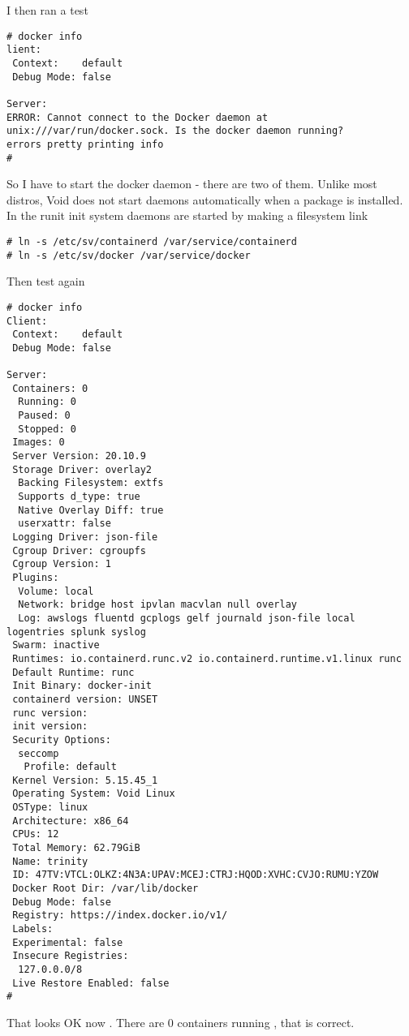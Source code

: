 \documentclass{article}  %
\begin{document}
I then ran a test
\begin{verbatim}
# docker info
lient:
 Context:    default
 Debug Mode: false

Server:
ERROR: Cannot connect to the Docker daemon at unix:///var/run/docker.sock. Is the docker daemon running?
errors pretty printing info
# 
\end{verbatim}

 So I have to start the docker daemon - there are two of them. Unlike most distros, Void does not start daemons automatically when a package is installed. In the runit init system daemons are started by making a filesystem link
\begin{verbatim}
# ln -s /etc/sv/containerd /var/service/containerd
# ln -s /etc/sv/docker /var/service/docker
\end{verbatim}

Then test again
\begin{verbatim}
# docker info
Client:
 Context:    default
 Debug Mode: false

Server:
 Containers: 0
  Running: 0
  Paused: 0
  Stopped: 0
 Images: 0
 Server Version: 20.10.9
 Storage Driver: overlay2
  Backing Filesystem: extfs
  Supports d_type: true
  Native Overlay Diff: true
  userxattr: false
 Logging Driver: json-file
 Cgroup Driver: cgroupfs
 Cgroup Version: 1
 Plugins:
  Volume: local
  Network: bridge host ipvlan macvlan null overlay
  Log: awslogs fluentd gcplogs gelf journald json-file local logentries splunk syslog
 Swarm: inactive
 Runtimes: io.containerd.runc.v2 io.containerd.runtime.v1.linux runc
 Default Runtime: runc
 Init Binary: docker-init
 containerd version: UNSET
 runc version: 
 init version: 
 Security Options:
  seccomp
   Profile: default
 Kernel Version: 5.15.45_1
 Operating System: Void Linux
 OSType: linux
 Architecture: x86_64
 CPUs: 12
 Total Memory: 62.79GiB
 Name: trinity
 ID: 47TV:VTCL:OLKZ:4N3A:UPAV:MCEJ:CTRJ:HQOD:XVHC:CVJO:RUMU:YZOW
 Docker Root Dir: /var/lib/docker
 Debug Mode: false
 Registry: https://index.docker.io/v1/
 Labels:
 Experimental: false
 Insecure Registries:
  127.0.0.0/8
 Live Restore Enabled: false
#
\end{verbatim}
 That looks OK now . There are 0 containers running , that is correct.
\end{document}
